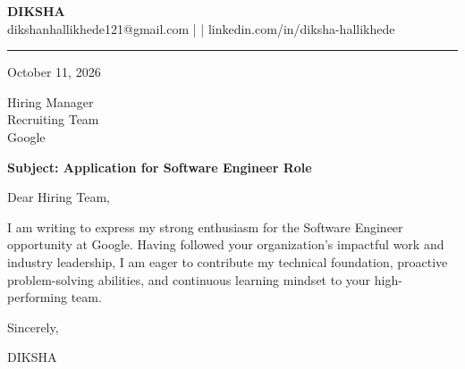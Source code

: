 \documentclass[11pt,a4paper]{article}
\begin{document}
\begin{center}
{\LARGE \textbf{DIKSHA}} \\ \vspace{4pt}
{\small dikshanhallikhede121@gmail.com \quad |  \quad | \quad linkedin.com/in/diksha-hallikhede}
\end{center} \vspace{8pt} \hrule \vspace{14pt}

October 11, 2026 \par \vspace{10pt}

Hiring Manager \\
Recruiting Team \\
Google \par \vspace{10pt}

\textbf{Subject: Application for Software Engineer Role} \par \vspace{10pt}

Dear Hiring Team, \par \vspace{10pt}

I am writing to express my strong enthusiasm for the Software Engineer opportunity at Google. Having followed your organization's impactful work and industry leadership, I am eager to contribute my technical foundation, proactive problem-solving abilities, and continuous learning mindset to your high-performing team. \par \vspace{10pt}

Sincerely, \par \vspace{14pt}

DIKSHA
\end{document}
